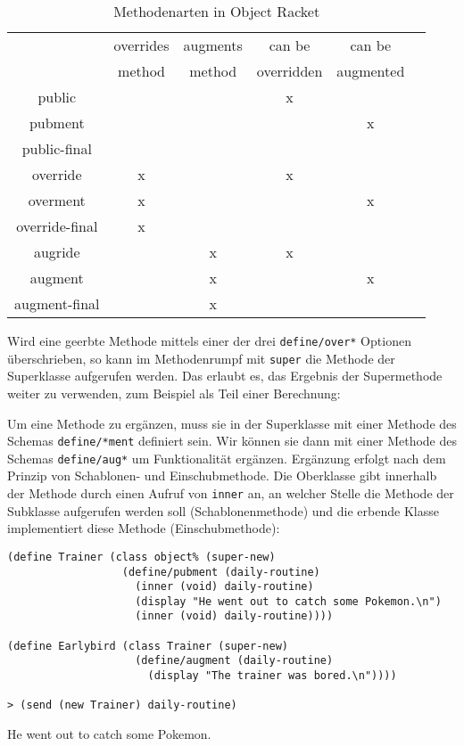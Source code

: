 \begin{table}[h]
 \centering
\begin{tabular}{|c|c|c|c|c|c}
 \hline
                & overrides & augments & can be     & can be    \\
                & method    & method   & overridden & augmented \\ \hline
 public         &           &          &     x      &           \\ \hline
 pubment        &           &          &            &    x      \\ \hline
 public-final   &           &          &            &           \\ \hline
 override       &     x     &          &     x      &           \\ \hline
 overment       &     x     &          &            &    x      \\ \hline
 override-final &     x     &          &            &           \\ \hline
 augride        &           &    x     &     x      &           \\ \hline
 augment        &           &    x     &            &    x      \\ \hline
 augment-final  &           &    x     &            &           \\ \hline
\end{tabular}
\caption{Methodenarten in Object Racket}
\label{methods}
\end{table}

Wird eine geerbte Methode mittels einer der drei \texttt{define/over*} Optionen überschrieben, so kann im Methodenrumpf mit \texttt{super} die Methode der Superklasse aufgerufen werden. Das erlaubt es, das Ergebnis der Supermethode weiter zu verwenden, zum Beispiel als Teil einer Berechnung:



Um eine Methode zu ergänzen, muss sie in der Superklasse mit einer Methode des Schemas \texttt{define/*ment} definiert sein. Wir können sie dann mit einer Methode des Schemas \texttt{define/aug*} um Funktionalität ergänzen. Ergänzung erfolgt nach dem Prinzip von Schablonen- und Einschubmethode. Die Oberklasse gibt innerhalb der Methode durch einen Aufruf von \texttt{inner} an, an welcher Stelle die Methode der Subklasse aufgerufen werden soll (Schablonenmethode) und die erbende Klasse implementiert diese Methode (Einschubmethode):

\begin{lstlisting}
(define Trainer (class object% (super-new)
                  (define/pubment (daily-routine)
                    (inner (void) daily-routine)
                    (display "He went out to catch some Pokemon.\n")
                    (inner (void) daily-routine))))

(define Earlybird (class Trainer (super-new)
                    (define/augment (daily-routine)
                      (display "The trainer was bored.\n"))))
                      
> (send (new Trainer) daily-routine)
\end{lstlisting}
{\routput He went out to catch some Pokemon.}

